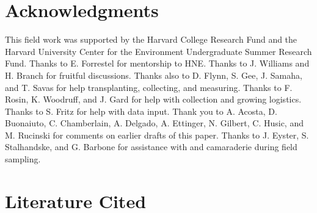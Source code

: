 \documentclass[12pt]{article}\usepackage[]{graphicx}\usepackage[]{color}
\begin{document}
\section{Acknowledgments}
This field work was supported by the Harvard College Research Fund and the Harvard University Center for the Environment Undergraduate Summer Research Fund. Thanks to E. Forrestel for mentorship to HNE. Thanks to J. Williams and H. Branch for fruitful discussions. Thanks also to D. Flynn, S. Gee, J. Samaha, and T. Savas for help transplanting, collecting, and measuring. Thanks to F. Rosin, K. Woodruff, and J. Gard for help with collection and growing logistics. Thanks to S. Fritz for help with data input. Thank you to A. Acosta, D. Buonaiuto, C. Chamberlain, A. Delgado, A. Ettinger, N. Gilbert, C. Husic, and M. Rucinski for comments on earlier drafts of this paper. Thanks to J. Eyster, S. Stalhandske, and G. Barbone for assistance with and camaraderie during field sampling. 

	

\section{Literature Cited}
\printbibliography
\end{document}
